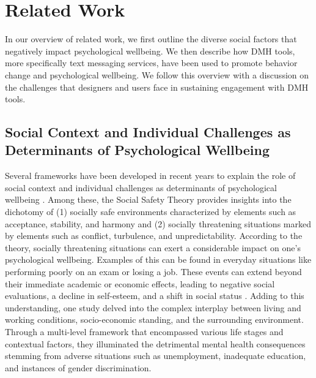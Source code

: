 \section{Related Work}

In our overview of related work, we first outline the diverse social factors that negatively impact psychological wellbeing.
We then describe how DMH tools, more specifically text messaging services, have been used to promote behavior change and psychological wellbeing.
We follow this overview with a discussion on the challenges that designers and users face in sustaining engagement with DMH tools.

\subsection{Social Context and Individual Challenges as Determinants of Psychological Wellbeing}

Several frameworks have been developed in recent years to explain the role of social context and individual challenges as determinants of psychological wellbeing \cite{slavich2020social, slavich2023social, allen2014social, glanz2008health, tachtler2021unaccompanied, oguamanam2023intersectional, sallis2015ecological, yoo2024missed}. Among these, the Social Safety Theory \cite{slavich2020social} provides insights into the dichotomy of (1) socially safe environments characterized by elements such as acceptance, stability, and harmony and (2) socially threatening situations marked by elements such as conflict, turbulence, and unpredictability. According to the theory, socially threatening situations can exert a considerable impact on one's psychological wellbeing. Examples of this can be found in everyday situations like performing poorly on an exam or losing a job. These events can extend beyond their immediate academic or economic effects, leading to negative social evaluations, a decline in self-esteem, and a shift in social status \cite{diamond2022rethinking, noronha2018study, bhattacharjee2021understanding, katz2017self}. Adding to this understanding, one study \cite{allen2014social} delved into the complex interplay between living and working conditions, socio-economic standing, and the surrounding environment. Through a multi-level framework that encompassed various life stages and contextual factors, they illuminated the detrimental mental health consequences stemming from adverse situations such as unemployment, inadequate education, and instances of gender discrimination.


